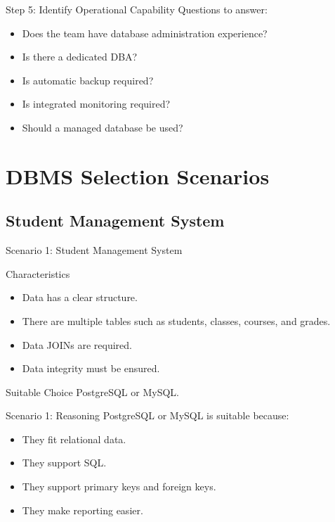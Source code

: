 \documentclass[aspectratio=169,11pt]{beamer}
\newcommand{\smallitem}{\setlength{\itemsep}{2pt}\setlength{\parskip}{0pt}}
\begin{document}
\begin{frame}{Step 5: Identify Operational Capability}
Questions to answer:
\begin{itemize}
  \smallitem
  \item Does the team have database administration experience?
  \item Is there a dedicated DBA?
  \item Is automatic backup required?
  \item Is integrated monitoring required?
  \item Should a managed database be used?
\end{itemize}
\end{frame}

\section{DBMS Selection Scenarios}
\subsection{Student Management System}

\begin{frame}{Scenario 1: Student Management System}
\begin{block}{Characteristics}
\begin{itemize}
  \smallitem
  \item Data has a clear structure.
  \item There are multiple tables such as students, classes, courses, and grades.
  \item Data JOINs are required.
  \item Data integrity must be ensured.
\end{itemize}
\end{block}

\begin{exampleblock}{Suitable Choice}
PostgreSQL or MySQL.
\end{exampleblock}
\end{frame}

\begin{frame}{Scenario 1: Reasoning}
PostgreSQL or MySQL is suitable because:
\begin{itemize}
  \smallitem
  \item They fit relational data.
  \item They support SQL.
  \item They support primary keys and foreign keys.
  \item They make reporting easier.
\end{itemize}
\end{frame}
\end{document}
